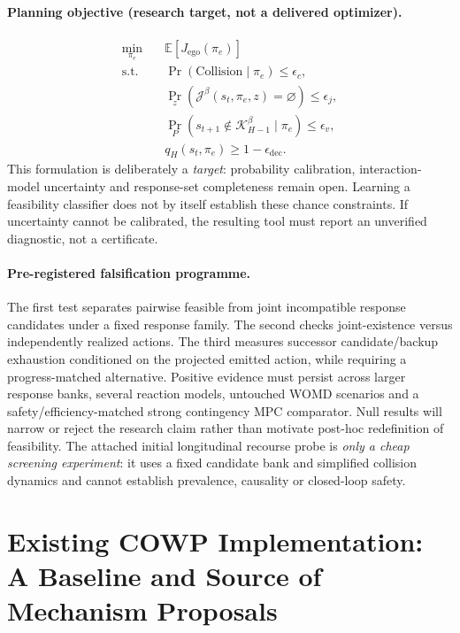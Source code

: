 \documentclass[10pt]{article}
\begin{document}
\paragraph{Planning objective (research target, not a delivered optimizer).}
\begin{align}
\min_{\pi_e}\quad &\mathbb E[J_{\mathrm{ego}}(\pi_e)]\\
\mathrm{s.t.}\quad &\Pr(\mathrm{Collision}\mid\pi_e)\le\epsilon_c,\nonumber\\
 &\Pr_{z}(\mathcal J^\beta(s_t,\pi_e,z)=\varnothing)\le\epsilon_j,\nonumber\\
 &\Pr_P(s_{t+1}\notin\mathcal K_{H-1}^{\beta}\mid\pi_e)\le\epsilon_v,\\
 &q_H(s_t,\pi_e)\ge 1-\epsilon_{\mathrm{dec}}.
\label{eq:research_optimization}
\end{align}
This formulation is deliberately a \emph{target}: probability calibration, interaction-model uncertainty and response-set completeness remain open. Learning a feasibility classifier does not by itself establish these chance constraints. If uncertainty cannot be calibrated, the resulting tool must report an unverified diagnostic, not a certificate.

\paragraph{Pre-registered falsification programme.}
The first test separates pairwise feasible from joint incompatible response candidates under a fixed response family. The second checks joint-existence versus independently realized actions. The third measures successor candidate/backup exhaustion conditioned on the projected emitted action, while requiring a progress-matched alternative. Positive evidence must persist across larger response banks, several reaction models, untouched WOMD scenarios and a safety/efficiency-matched strong contingency MPC comparator. Null results will narrow or reject the research claim rather than motivate post-hoc redefinition of feasibility. The attached initial longitudinal recourse probe is \emph{only a cheap screening experiment}: it uses a fixed candidate bank and simplified collision dynamics and cannot establish prevalence, causality or closed-loop safety.

\section{Existing COWP Implementation: A Baseline and Source of Mechanism Proposals}
\label{sec:method}
\end{document}
